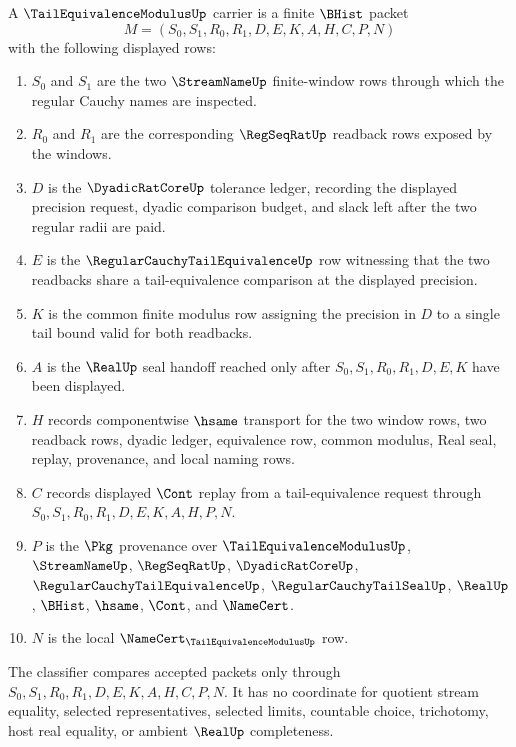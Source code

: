 \begin{definition}
\label{def:tail-equivalence-modulus-carrier}
A $\TailEquivalenceModulusUp$ carrier is a finite $\BHist$ packet
$$
M=(S_0,S_1,R_0,R_1,D,E,K,A,H,C,P,N)
$$
with the following displayed rows:
\begin{enumerate}
\item $S_0$ and $S_1$ are the two $\StreamNameUp$ finite-window rows through which the regular Cauchy names are inspected.
\item $R_0$ and $R_1$ are the corresponding $\RegSeqRatUp$ readback rows exposed by the windows.
\item $D$ is the $\DyadicRatCoreUp$ tolerance ledger, recording the displayed precision request, dyadic comparison budget, and slack left after the two regular radii are paid.
\item $E$ is the $\RegularCauchyTailEquivalenceUp$ row witnessing that the two readbacks share a tail-equivalence comparison at the displayed precision.
\item $K$ is the common finite modulus row assigning the precision in $D$ to a single tail bound valid for both readbacks.
\item $A$ is the $\RealUp$ seal handoff reached only after $S_0,S_1,R_0,R_1,D,E,K$ have been displayed.
\item $H$ records componentwise $\hsame$ transport for the two window rows, two readback rows, dyadic ledger, equivalence row, common modulus, Real seal, replay, provenance, and local naming rows.
\item $C$ records displayed $\Cont$ replay from a tail-equivalence request through $S_0,S_1,R_0,R_1,D,E,K,A,H,P,N$.
\item $P$ is the $\Pkg$ provenance over $\TailEquivalenceModulusUp$, $\StreamNameUp$, $\RegSeqRatUp$, $\DyadicRatCoreUp$, $\RegularCauchyTailEquivalenceUp$, $\RegularCauchyTailSealUp$, $\RealUp$, $\BHist$, $\hsame$, $\Cont$, and $\NameCert$.
\item $N$ is the local $\NameCert_{\TailEquivalenceModulusUp}$ row.
\end{enumerate}
The classifier compares accepted packets only through $S_0,S_1,R_0,R_1,D,E,K,A,H,C,P,N$. It has no coordinate for quotient stream equality, selected representatives, selected limits, countable choice, trichotomy, host real equality, or ambient $\RealUp$ completeness.
\end{definition}

